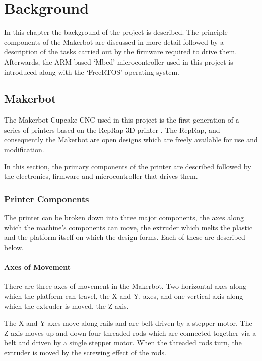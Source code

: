 \chapter{Background}
	
	\label{sec:background}
	
	In this chapter the background of the project is described. The principle
	components of the Makerbot are discussed in more detail followed by a
	description of the tasks carried out by the firmware required to drive them.
	Afterwards, the ARM based `Mbed' microcontroller used in this project is
	introduced along with the `FreeRTOS' operating system.
	
	\section{Makerbot}
		
		The Makerbot Cupcake CNC used in this project is the first generation of a
		series of printers based on the RepRap 3D printer \cite{makerbotcupcake}.
		The RepRap, and consequently the Makerbot are open designs which are freely
		available for use and modification.
		
		In this section, the primary components of the printer are described
		followed by the electronics, firmware and microcontroller that drives them.
		
		\subsection{Printer Components}
			
			The printer can be broken down into three major components, the axes along
			which the machine's components can move, the extruder which melts the
			plastic and the platform itself on which the design forms. Each of these
			are described below.
			
			\subsubsection{Axes of Movement}
				
				There are three axes of movement in the Makerbot. Two horizontal axes
				along which the platform can travel, the X and Y, axes, and one vertical
				axis along which the extruder is moved, the Z-axis.
				
				The X and Y axes move along rails and are belt driven by a stepper
				motor. The Z-axis moves up and down four threaded rods which are
				connected together via a belt and driven by a single stepper motor. When
				the threaded rods turn, the extruder is moved by the screwing effect of
				the rods.
				
